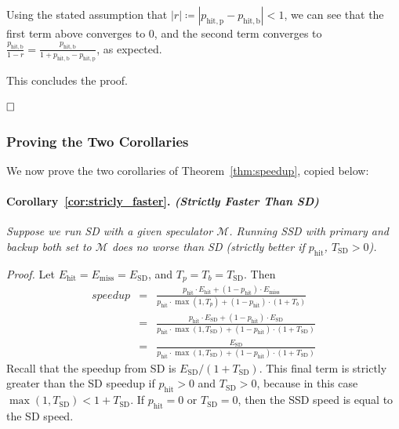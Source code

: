 Using the stated assumption that $|r| \coloneqq |p_{\mathrm{hit,p}} - p_{\mathrm{hit,b}}| < 1$, we can see that the first term above converges to 0, and the second term converges to $\frac{p_{\mathrm{hit,b}}}{1-r} = \frac{p_{\mathrm{hit,b}}}{1+p_{\mathrm{hit,b}} - p_{\mathrm{hit,p}}}$, as expected.

\noindent This concludes the proof.

$\hfill\square$

\subsubsection{Proving the Two Corollaries}

We now prove the two corollaries of Theorem~\ref{thm:speedup}, copied below:

\paragraph{Corollary~\ref{cor:stricly_faster}. \textit{(Strictly Faster Than SD)}}
\textit{Suppose we run SD with a given speculator $\mathcal{M}$.
Running SSD with primary and backup both set to $\mathcal{M}$ does no worse than SD (strictly better if $p_{\mathrm{hit}}$, $T_{\mathrm{SD}} > 0$).}

\textit{Proof.} Let $E_{\mathrm{hit}} = E_{\mathrm{miss}} = E_{\mathrm{SD}}$, and $T_p = T_b = T_{\mathrm{SD}}$.
Then
\begin{eqnarray*}
speedup &=& \frac{p_{\mathrm{hit}} \cdot E_{\mathrm{hit}} + (1-p_{\mathrm{hit}}) \cdot E_{\mathrm{miss}}}{p_{\mathrm{hit}} \cdot \max(1, T_p) + (1-p_{\mathrm{hit}}) \cdot (1 + T_b)} \\
&=& \frac{p_{\mathrm{hit}} \cdot E_{\mathrm{SD}} + (1-p_{\mathrm{hit}}) \cdot E_{\mathrm{SD}}}{p_{\mathrm{hit}} \cdot \max(1, T_{\mathrm{SD}}) + (1-p_{\mathrm{hit}}) \cdot (1 + T_{\mathrm{SD}})} \\
&=& \frac{E_{\mathrm{SD}}}{p_{\mathrm{hit}} \cdot \max(1, T_{\mathrm{SD}}) + (1-p_{\mathrm{hit}}) \cdot (1 + T_{\mathrm{SD}})}
\end{eqnarray*}
Recall that the speedup from SD is $E_{\mathrm{SD}}/(1+T_{\mathrm{SD}})$.
This final term is strictly greater than the SD speedup if $p_{\mathrm{hit}} > 0$ and $T_{\mathrm{SD}} > 0$, because in this case $\max(1,T_{\mathrm{SD}}) < 1 + T_{\mathrm{SD}}$.
If $p_{\mathrm{hit}} = 0$ or $T_{\mathrm{SD}} = 0$, then the SSD speed is equal to the SD speed.

